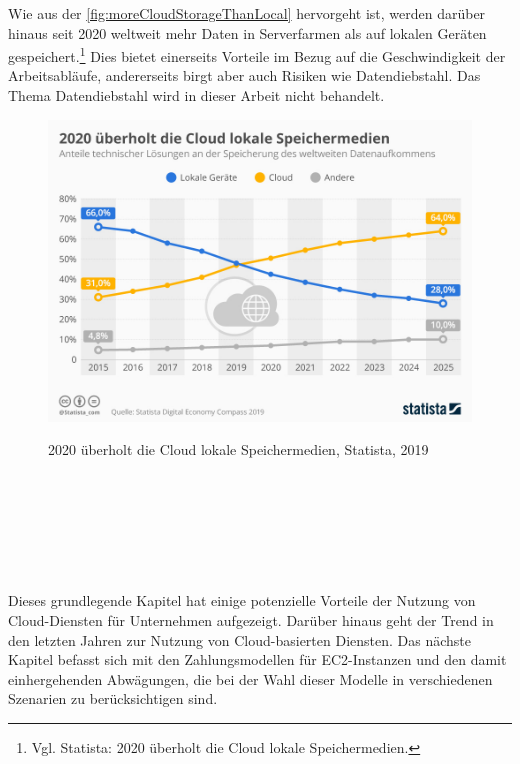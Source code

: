 Wie aus der \autoref{fig:moreCloudStorageThanLocal} hervorgeht ist, werden darüber hinaus seit 2020 weltweit mehr Daten in Serverfarmen als auf lokalen Geräten gespeichert.\footnote{Vgl. Statista: 2020 überholt die Cloud lokale Speichermedien.\cite{STA1}} Dies bietet einerseits  Vorteile im Bezug auf die Geschwindigkeit der Arbeitsabläufe, andererseits birgt aber auch Risiken wie Datendiebstahl. Das Thema Datendiebstahl wird in dieser Arbeit nicht behandelt.%
\begin{figure}[h!]
      \centering
      \includegraphics[scale=0.4]{sources/moreCloudStorageThanLocal}
      \caption[2020 überholt die Cloud lokale Speichermedien]{}\label{fig:moreCloudStorageThanLocal}
      2020 überholt die Cloud lokale Speichermedien, Statista, 2019 {\cite{STA1}}
\end{figure}
\\\\
\\\\
\\\\
Dieses grundlegende Kapitel hat einige potenzielle Vorteile der Nutzung von Cloud-Diensten für Unternehmen aufgezeigt. Darüber hinaus geht der Trend in den letzten Jahren zur Nutzung von Cloud-basierten Diensten. Das nächste Kapitel befasst sich mit den Zahlungsmodellen für EC2-Instanzen und den damit einhergehenden Abwägungen, die bei der Wahl dieser Modelle in verschiedenen Szenarien zu berücksichtigen sind.
\newpage

